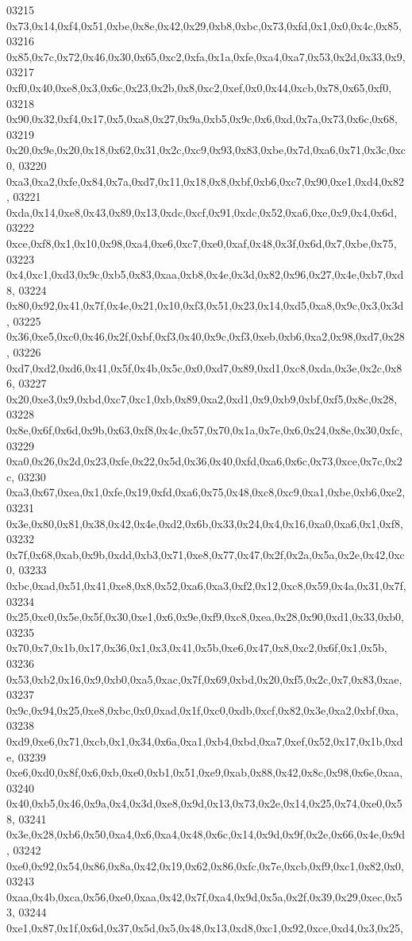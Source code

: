 \begin{DoxyCode}
03215   0x73,0x14,0xf4,0x51,0xbe,0x8e,0x42,0x29,0xb8,0xbc,0x73,0xfd,0x1,0x0,0x4c,0x85,
03216   0x85,0x7c,0x72,0x46,0x30,0x65,0xc2,0xfa,0x1a,0xfe,0xa4,0xa7,0x53,0x2d,0x33,0x9,
03217   0xf0,0x40,0xe8,0x3,0x6c,0x23,0x2b,0x8,0xc2,0xef,0x0,0x44,0xcb,0x78,0x65,0xf0,
03218   0x90,0x32,0xf4,0x17,0x5,0xa8,0x27,0x9a,0xb5,0x9c,0x6,0xd,0x7a,0x73,0x6c,0x68,
03219   0x20,0x9e,0x20,0x18,0x62,0x31,0x2c,0xc9,0x93,0x83,0xbe,0x7d,0xa6,0x71,0x3c,0xc0,
03220   0xa3,0xa2,0xfe,0x84,0x7a,0xd7,0x11,0x18,0x8,0xbf,0xb6,0xc7,0x90,0xe1,0xd4,0x82,
03221   0xda,0x14,0xe8,0x43,0x89,0x13,0xdc,0xcf,0x91,0xdc,0x52,0xa6,0xe,0x9,0x4,0x6d,
03222   0xce,0xf8,0x1,0x10,0x98,0xa4,0xe6,0xc7,0xe0,0xaf,0x48,0x3f,0x6d,0x7,0xbe,0x75,
03223   0x4,0xc1,0xd3,0x9c,0xb5,0x83,0xaa,0xb8,0x4e,0x3d,0x82,0x96,0x27,0x4e,0xb7,0xd8,
03224   0x80,0x92,0x41,0x7f,0x4e,0x21,0x10,0xf3,0x51,0x23,0x14,0xd5,0xa8,0x9c,0x3,0x3d,
03225   0x36,0xe5,0xc0,0x46,0x2f,0xbf,0xf3,0x40,0x9c,0xf3,0xeb,0xb6,0xa2,0x98,0xd7,0x28,
03226   0xd7,0xd2,0xd6,0x41,0x5f,0x4b,0x5c,0x0,0xd7,0x89,0xd1,0xc8,0xda,0x3e,0x2c,0x86,
03227   0x20,0xe3,0x9,0xbd,0xc7,0xc1,0xb,0x89,0xa2,0xd1,0x9,0xb9,0xbf,0xf5,0x8c,0x28,
03228   0x8e,0x6f,0x6d,0x9b,0x63,0xf8,0x4c,0x57,0x70,0x1a,0x7e,0x6,0x24,0x8e,0x30,0xfc,
03229   0xa0,0x26,0x2d,0x23,0xfe,0x22,0x5d,0x36,0x40,0xfd,0xa6,0x6c,0x73,0xce,0x7c,0x2c,
03230   0xa3,0x67,0xea,0x1,0xfe,0x19,0xfd,0xa6,0x75,0x48,0xc8,0xc9,0xa1,0xbe,0xb6,0xe2,
03231   0x3e,0x80,0x81,0x38,0x42,0x4e,0xd2,0x6b,0x33,0x24,0x4,0x16,0xa0,0xa6,0x1,0xf8,
03232   0x7f,0x68,0xab,0x9b,0xdd,0xb3,0x71,0xe8,0x77,0x47,0x2f,0x2a,0x5a,0x2e,0x42,0xc0,
03233   0xbc,0xad,0x51,0x41,0xe8,0x8,0x52,0xa6,0xa3,0xf2,0x12,0xc8,0x59,0x4a,0x31,0x7f,
03234   0x25,0xc0,0x5e,0x5f,0x30,0xe1,0x6,0x9e,0xf9,0xc8,0xea,0x28,0x90,0xd1,0x33,0xb0,
03235   0x70,0x7,0x1b,0x17,0x36,0x1,0x3,0x41,0x5b,0xe6,0x47,0x8,0xc2,0x6f,0x1,0x5b,
03236   0x53,0xb2,0x16,0x9,0xb0,0xa5,0xac,0x7f,0x69,0xbd,0x20,0xf5,0x2c,0x7,0x83,0xae,
03237   0x9c,0x94,0x25,0xe8,0xbc,0x0,0xad,0x1f,0xc0,0xdb,0xcf,0x82,0x3e,0xa2,0xbf,0xa,
03238   0xd9,0xe6,0x71,0xcb,0x1,0x34,0x6a,0xa1,0xb4,0xbd,0xa7,0xef,0x52,0x17,0x1b,0xde,
03239   0xe6,0xd0,0x8f,0x6,0xb,0xe0,0xb1,0x51,0xe9,0xab,0x88,0x42,0x8c,0x98,0x6e,0xaa,
03240   0x40,0xb5,0x46,0x9a,0x4,0x3d,0xe8,0x9d,0x13,0x73,0x2e,0x14,0x25,0x74,0xe0,0x58,
03241   0x3e,0x28,0xb6,0x50,0xa4,0x6,0xa4,0x48,0x6c,0x14,0x9d,0x9f,0x2e,0x66,0x4e,0x9d,
03242   0xe0,0x92,0x54,0x86,0x8a,0x42,0x19,0x62,0x86,0xfc,0x7e,0xcb,0xf9,0xc1,0x82,0x0,
03243   0xaa,0x4b,0xca,0x56,0xe0,0xaa,0x42,0x7f,0xa4,0x9d,0x5a,0x2f,0x39,0x29,0xec,0x53,
03244   0xe1,0x87,0x1f,0x6d,0x37,0x5d,0x5,0x48,0x13,0xd8,0xc1,0x92,0xce,0xd4,0x3,0x25,

\end{DoxyCode}
